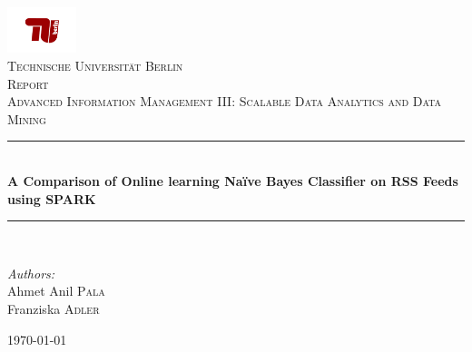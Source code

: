 \begin{titlepage}

\begin{center}

\includegraphics[width=0.15\textwidth]{./logoTUBerlin}\\[1cm]    

\textsc{\LARGE Technische Universit\"at Berlin}\\[1.5cm]
\textsc{\Large Report}\\[0.2cm]
\textsc{ Advanced Information Management III: Scalable Data Analytics and Data Mining}\\[0.5cm]


\newcommand{\HRule}{\rule{\linewidth}{0.5mm}}
\HRule \\[0.4cm]

{ \Large \bfseries A Comparison of Online learning Na\"ive Bayes Classifier on RSS Feeds using SPARK}\\[0.4cm]

\HRule \\[1.5cm]

\begin{flushleft} \large
\emph{Authors:}\\
Ahmet Anil \textsc{Pala}\\
Franziska \textsc{Adler}
\end{flushleft}

\vfill

{\large \today}

\end{center}

\end{titlepage}